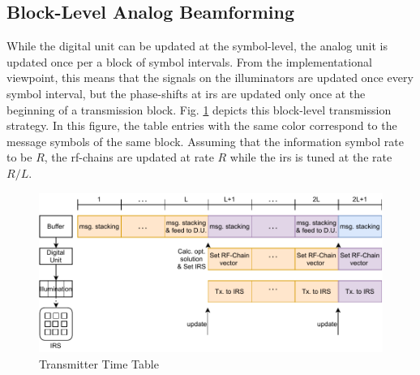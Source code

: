 \documentclass[12pt,draftclsnofoot,onecolumn,journal]{IEEEtran}
\begin{document}
\subsection{Block-Level Analog Beamforming}
While the digital unit can be updated at the symbol-level, the analog unit is updated once per a block of symbol intervals. From the implementational viewpoint, this means that the signals on the illuminators are updated once every symbol interval, but the phase-shifts at \ac{irs} are updated only once at the beginning of a transmission block. Fig. \ref{fig:abssys} depicts this block-level transmission strategy. In this figure, the table entries with the same color correspond to the message symbols of the same block. %
Assuming that the information symbol rate to be $R$, the \ac{rf}-chains are updated at rate $R$ while the \ac{irs} is tuned at the rate $R/L$.
\begin{figure}[htbp]\flushleft
	\includegraphics[width=6in]{modeltime.pdf} 
	\caption{Transmitter Time Table} \label{fig:abssys}
\end{figure}
\end{document}
